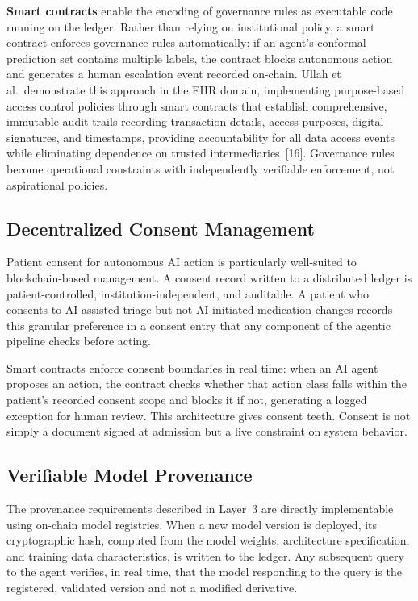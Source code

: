 \textbf{Smart contracts} enable the encoding of governance rules as
executable code running on the ledger. Rather than relying on
institutional policy, a smart contract enforces governance rules
automatically: if an agent's conformal prediction set contains multiple
labels, the contract blocks autonomous action and generates a human
escalation event recorded on-chain. Ullah et al.~demonstrate this
approach in the EHR domain, implementing purpose-based access control
policies through smart contracts that establish comprehensive, immutable
audit trails recording transaction details, access purposes, digital
signatures, and timestamps, providing accountability for all data access
events while eliminating dependence on trusted intermediaries~{[}16{]}.
Governance rules become operational constraints with independently
verifiable enforcement, not aspirational policies.

\subsection{Decentralized Consent
Management}\label{decentralized-consent-management}

Patient consent for autonomous AI action is particularly well-suited to
blockchain-based management. A consent record written to a distributed
ledger is patient-controlled, institution-independent, and auditable. A
patient who consents to AI-assisted triage but not AI-initiated
medication changes records this granular preference in a consent entry
that any component of the agentic pipeline checks before acting.

Smart contracts enforce consent boundaries in real time: when an AI
agent proposes an action, the contract checks whether that action class
falls within the patient's recorded consent scope and blocks it if not,
generating a logged exception for human review. This architecture gives
consent teeth. Consent is not simply a document signed at admission but
a live constraint on system behavior.

\subsection{Verifiable Model
Provenance}\label{verifiable-model-provenance}

The provenance requirements described in Layer~3 are directly
implementable using on-chain model registries. When a new model version
is deployed, its cryptographic hash, computed from the model weights,
architecture specification, and training data characteristics, is
written to the ledger. Any subsequent query to the agent verifies, in
real time, that the model responding to the query is the registered,
validated version and not a modified derivative.

